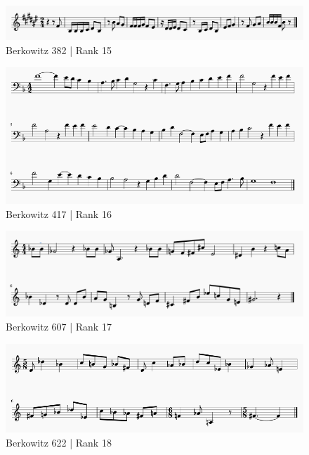 \documentclass[]{book}
\begin{document}
\begin{figure}

{\centering \includegraphics[width=1\linewidth]{img/survey_melodies/Berkowitz382t} 

}

\caption{Berkowitz 382 | Rank 15}\label{fig:berk382}
\end{figure}

\begin{figure}

{\centering \includegraphics[width=1\linewidth]{img/survey_melodies/Berkowitz417tx} 

}

\caption{Berkowitz 417 | Rank 16}\label{fig:berk417tx}
\end{figure}

\begin{figure}

{\centering \includegraphics[width=1\linewidth]{img/survey_melodies/Berkowitz607tx} 

}

\caption{Berkowitz 607 | Rank 17}\label{fig:berk607tx}
\end{figure}

\begin{figure}

{\centering \includegraphics[width=1\linewidth]{img/survey_melodies/Berkowitz622} 

}

\caption{Berkowitz 622 | Rank 18}\label{fig:berk622}
\end{figure}
\end{document}

